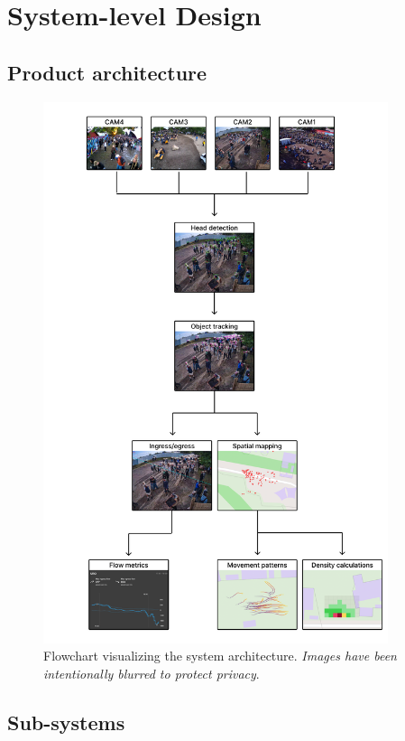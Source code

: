 \chapter{System-level Design}
\label{chap:system-level-design}

\section{Product architecture}

\begin{figure}
  \centering
  \includegraphics[width=0.9\textwidth]{Pictures/Figures/system_flowchart.png}
  \caption{Flowchart visualizing the system architecture. \textit{Images have been intentionally blurred to protect privacy}.}
\end{figure}


\section{Sub-systems}

